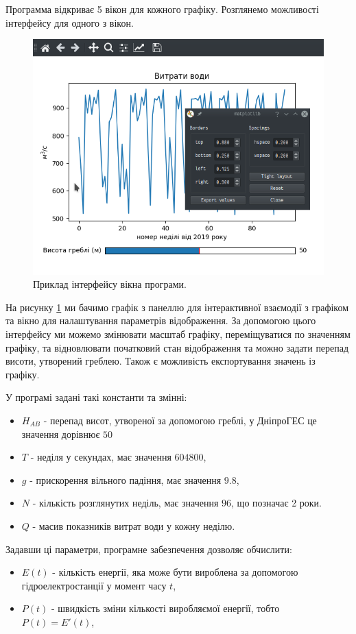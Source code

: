\documentclass[12pt]{article}
\numberwithin{equation}{section}
\numberwithin{figure}{section}
\begin{document}
Программа відкриває 5 вікон для кожного графіку. Розглянемо можливості інтерфейсу для одного з вікон.

\begin{figure}[!htb]
	\centering
	\includegraphics[width=0.7\linewidth]{02.PNG}
	\caption{Приклад інтерфейсу вікна програми.}\label{img:interface}
\end{figure}

На рисунку \ref{img:interface} ми бачимо графік з панеллю для інтерактивної взаємодії з графіком та вікно для налаштування параметрів відображення. За допомогою цього інтерфейсу ми можемо змінювати масштаб графіку, переміщуватися по значенням графіку, та відновлювати початковий стан відображення та можно задати перепад висоти, утворений греблею. Також є можливість експортування значень із графіку. 

У програмі задані такі константи та змінні:
\begin{itemize}
\item $H_{AB}$ - перепад висот, утвореної за допомогою греблі, у ДніпроГЕС це значення дорівнює $50$
\item $T$ - неділя у секундах, має значення $604800$,
\item $g$ - прискорення вільного падіння, має значення $9.8$,
\item $N$ - кількість розглянутих неділь, має значення $96$, що позначає 2 роки.
\item $Q$ - масив показників витрат води у кожну неділю.
\end{itemize}

Задавши ці параметри, програмне забезпечення дозволяє обчислити:

\begin{itemize}
\item $E(t)$ - кількість енергії, яка може бути вироблена за допомогою гідроелектростанції у момент часу $t$,
\item $P(t)$ - швидкість зміни кількості виробляємої енергії, тобто $P(t)=E'(t)$,
\end{itemize}
\end{document}
